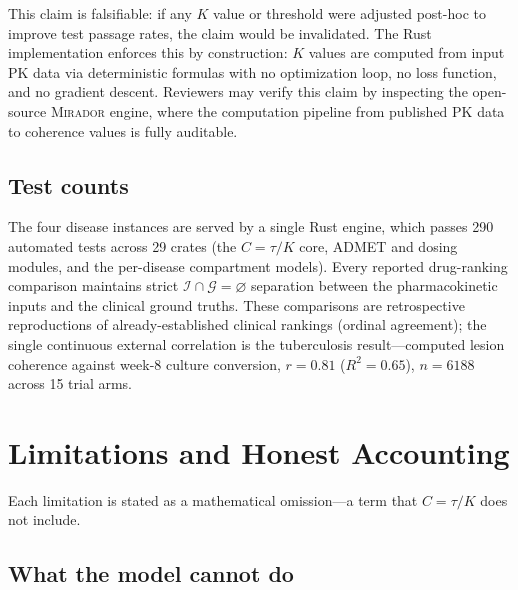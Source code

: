\documentclass[11pt]{article}
\theoremstyle{plain}
\theoremstyle{definition}
\newcommand{\mirador}{\textsc{Mirador}}
\begin{document}
This claim is falsifiable: if any $K$ value or threshold were
adjusted post-hoc to improve test passage rates, the claim would be
invalidated. The Rust implementation enforces this by construction:
$K$ values are computed from input PK data via deterministic
formulas with no optimization loop, no loss function, and no
gradient descent. Reviewers may verify this claim by inspecting
the open-source \mirador{} engine, where the computation pipeline
from published PK data to coherence values is fully auditable.

\subsection{Test counts}
\label{sec:test-counts}

The four disease instances are served by a single Rust engine, which
passes 290 automated tests across 29 crates (the $C = \tau/K$ core,
ADMET and dosing modules, and the per-disease compartment models).
Every reported drug-ranking comparison maintains strict
$\mathcal{I} \cap \mathcal{G} = \varnothing$ separation between the
pharmacokinetic inputs and the clinical ground truths. These
comparisons are retrospective reproductions of already-established
clinical rankings (ordinal agreement); the single continuous external
correlation is the tuberculosis result---computed lesion coherence
against week-8 culture conversion, $r = 0.81$ ($R^2 = 0.65$),
$n = 6188$ across 15 trial arms.

\section{Limitations and Honest Accounting}
\label{sec:limitations}

Each limitation is stated as a mathematical omission---a term that
$C = \tau / K$ does not include.

\subsection{What the model cannot do}
\label{sec:cannot}
\end{document}
